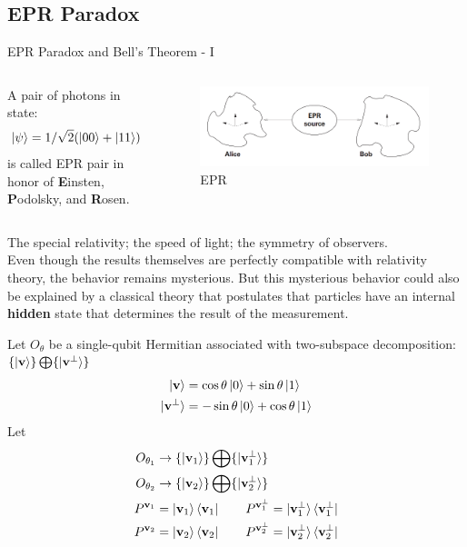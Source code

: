 \documentclass{beamer}
\begin{document}
\subsection{EPR Paradox}
\begin{frame}{EPR Paradox and Bell's Theorem - I}
  {\tiny
  \begin{columns}
  A pair of photons in state:
  \begin{align*}
    \ket{\psi} = 1/\sqrt2(\ket{00} + \ket{11})
  \end{align*}
  is called EPR pair in honor of \textbf{E}insten, \textbf{P}odolsky, and \textbf{R}osen.

  \begin{figure}
    \includegraphics[scale=0.15]{figures/EPR}
    \caption{EPR}
  \end{figure}
  \end{columns}
  The special relativity; the speed of light; the symmetry of observers. \\
  Even though the results themselves are perfectly compatible with relativity theory, the behavior remains mysterious.
  But this mysterious behavior could also be explained by a classical theory that postulates that
  particles have an internal \textbf{hidden} state that determines the result of the measurement.

  \vspace{0.3cm}
  Let $O_{\theta}$ be a single-qubit Hermitian associated with two-subspace decomposition:
    $\{\ket{\mathbf{v}}\} \bigoplus \{\ket{\mathbf{v}^{\perp}}\}$
  \begin{align*}
    \ket{\mathbf{v}} &= \cos \theta \ket0 + \sin \theta \ket1 \\
    \ket{\mathbf{v}^{\perp}} &= -\sin \theta \ket0 + \cos \theta \ket1
  \end{align*}
  Let
  \begin{align*}
    O_{\theta_{1}} &\rightarrow \{\ket{\mathbf{v}_1}\} \bigoplus \{\ket{\mathbf{v}_1^{\perp}}\} \\
    O_{\theta_{2}} &\rightarrow \{\ket{\mathbf{v}_2}\} \bigoplus \{\ket{\mathbf{v}_2^{\perp}}\} \\
    P^{\mathbf{v}_1} &= \ket{\mathbf{v}_1} \bra{\mathbf{v}_1}
    \qquad
    P^{\mathbf{v}_1^{\perp}} = \ket{\mathbf{v}_1^{\perp}} \bra{\mathbf{v}_1^{\perp}}
    \\
    P^{\mathbf{v}_2} &= \ket{\mathbf{v}_2} \bra{\mathbf{v}_2}
    \qquad
    P^{\mathbf{v}_2^{\perp}} = \ket{\mathbf{v}_2^{\perp}} \bra{\mathbf{v}_2^{\perp}}
  \end{align*}
  }%
\end{frame}
\end{document}
